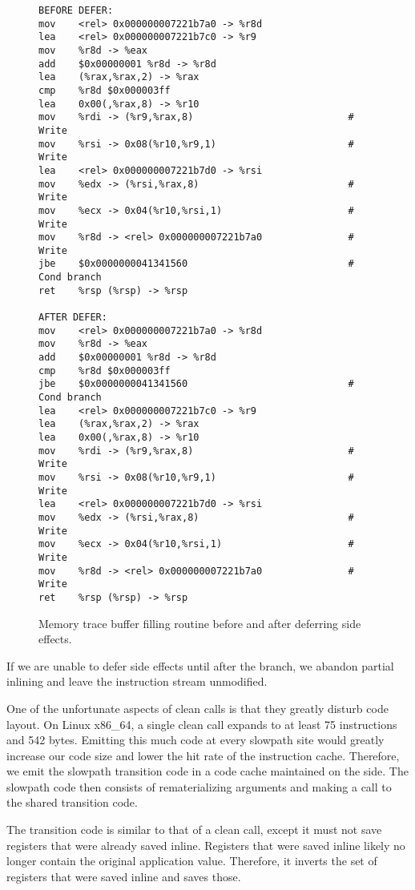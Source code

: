 \begin{figure}
\begin{verbatim}
BEFORE DEFER:
mov    <rel> 0x000000007221b7a0 -> %r8d 
lea    <rel> 0x000000007221b7c0 -> %r9 
mov    %r8d -> %eax 
add    $0x00000001 %r8d -> %r8d 
lea    (%rax,%rax,2) -> %rax 
cmp    %r8d $0x000003ff 
lea    0x00(,%rax,8) -> %r10 
mov    %rdi -> (%r9,%rax,8)                           # Write
mov    %rsi -> 0x08(%r10,%r9,1)                       # Write
lea    <rel> 0x000000007221b7d0 -> %rsi 
mov    %edx -> (%rsi,%rax,8)                          # Write
mov    %ecx -> 0x04(%r10,%rsi,1)                      # Write
mov    %r8d -> <rel> 0x000000007221b7a0               # Write
jbe    $0x0000000041341560                            # Cond branch
ret    %rsp (%rsp) -> %rsp 

AFTER DEFER:
mov    <rel> 0x000000007221b7a0 -> %r8d 
mov    %r8d -> %eax 
add    $0x00000001 %r8d -> %r8d 
cmp    %r8d $0x000003ff 
jbe    $0x0000000041341560                            # Cond branch
lea    <rel> 0x000000007221b7c0 -> %r9 
lea    (%rax,%rax,2) -> %rax 
lea    0x00(,%rax,8) -> %r10 
mov    %rdi -> (%r9,%rax,8)                           # Write
mov    %rsi -> 0x08(%r10,%r9,1)                       # Write
lea    <rel> 0x000000007221b7d0 -> %rsi 
mov    %edx -> (%rsi,%rax,8)                          # Write
mov    %ecx -> 0x04(%r10,%rsi,1)                      # Write
mov    %r8d -> <rel> 0x000000007221b7a0               # Write
ret    %rsp (%rsp) -> %rsp 
\end{verbatim}
\caption{Memory trace buffer filling routine before and after deferring side
effects.}
\label{fig:memtrace_defer}
\end{figure}

If we are unable to defer side effects until after the branch, we abandon
partial inlining and leave the instruction stream unmodified.

One of the unfortunate aspects of clean calls is that they greatly disturb code
layout.  On Linux x86\_64, a single clean call expands to at least 75
instructions and 542 bytes.  Emitting this much code at every slowpath site
would greatly increase our code size and lower the hit rate of the instruction
cache.  Therefore, we emit the slowpath transition code in a code cache
maintained on the side.  The slowpath code then consists of rematerializing
arguments and making a call to the shared transition code.

The transition code is similar to that of a clean call, except it must not save
registers that were already saved inline.  Registers that were saved inline
likely no longer contain the original application value.  Therefore, it inverts
the set of registers that were saved inline and saves those.

